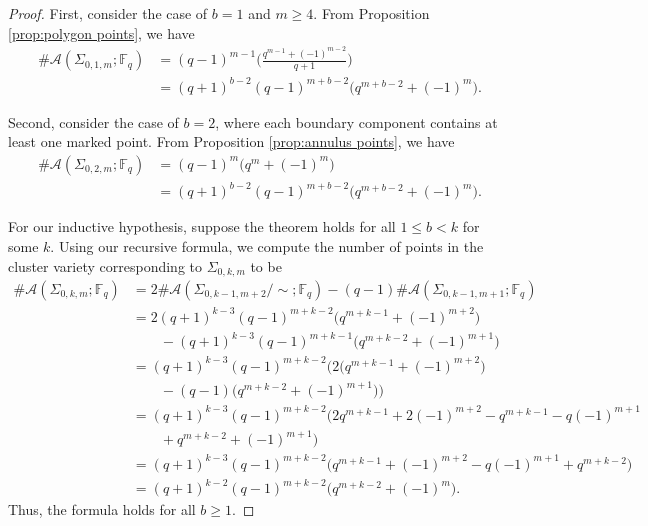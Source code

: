 \documentclass[10pt,a4paper]{amsart}
\begin{document}
\begin{proof}
    First, consider the case of $b=1$ and $m\geq 4$. From Proposition \ref{prop:polygon points}, we have 
    \begin{align*}
     \#\mathcal{A}(\Sigma_{0,1,m}; \mathbb{F}_q) &= (q-1)^{m-1} \Bigg( \frac{q^{m-1} + (-1)^{m-2}}{q+1} \Bigg) \\
     &= (q+1)^{b-2} (q-1)^{m+b-2} \big( q^{m+b-2} + (-1)^{m}\big).
    \end{align*}
    
    Second, consider the case of $b=2$, where each boundary component contains at least one marked point. From Proposition \ref{prop:annulus points}, we have
    \begin{align*}
     \#\mathcal{A}(\Sigma_{0,2,m}; \mathbb{F}_q) &= (q-1)^{m} \big( q^{m} + (-1)^{m} \big) \\
     &= (q+1)^{b-2} (q-1)^{m+b-2} \big( q^{m+b-2} + (-1)^{m}\big).
    \end{align*}
    
    For our inductive hypothesis, suppose the theorem holds for all $1 \leq b<k$ for some $k$. Using our recursive formula, we compute the number of points in the cluster variety corresponding to $\Sigma_{0,k,m}$ to be 
    \begin{align*}
        \#\mathcal{A}(\Sigma_{0,k,m}; \mathbb{F}_q) &= 2 \#\mathcal{A}(\Sigma_{0,k-1,m+2}/\!\sim; \mathbb{F}_q) - (q-1)\#\mathcal{A}(\Sigma_{0,k-1,m+1}; \mathbb{F}_q) \\
        &= 2(q+1)^{k-3} (q-1)^{m+k-2} \big( q^{m+k-1} + (-1)^{m+2}\big) \\ &\quad\quad - (q+1)^{k-3} (q-1)^{m+k-1} \big( q^{m+k-2} + (-1)^{m+1}\big) \\
        &= (q+1)^{k-3} (q-1)^{m+k-2} \big( 2\big(q^{m+k-1} + (-1)^{m+2}\big) \\ &\quad\quad - (q-1)\big(q^{m+k-2} + (-1)^{m+1}\big)\big) \\
        &= (q+1)^{k-3} (q-1)^{m+k-2} \big( 2q^{m+k-1} + 2(-1)^{m+2} - q^{m+k-1} - q(-1)^{m+1} \\ &\quad\quad + q^{m+k-2} + (-1)^{m+1} \big) \\
        &= (q+1)^{k-3} (q-1)^{m+k-2} \big( q^{m+k-1} + (-1)^{m+2} - q(-1)^{m+1} + q^{m+k-2} \big) \\
        &= (q+1)^{k-2} (q-1)^{m+k-2}\big( q^{m+k-2} + (-1)^{m}\big).
    \end{align*}
    Thus, the formula holds for all $b \geq 1$. 
\end{proof}
\end{document}
